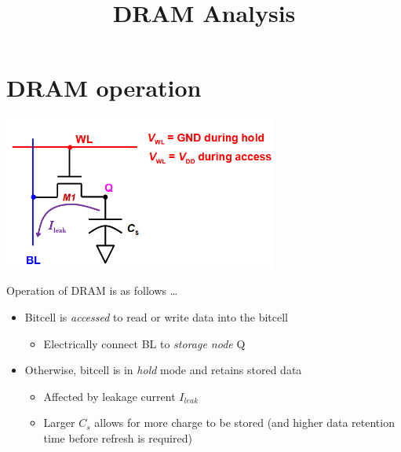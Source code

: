 \documentclass{article}
\title{\vspace{-2cm} DRAM Analysis}
\date{\vspace{-5ex}}
\begin{document}
\maketitle

\section{DRAM operation}
\begin{minipage}[c]{0.5\textwidth}
    \vspace{0pt}
    \includegraphics[width=9cm, scale=1]{dramOverview.PNG}
\end{minipage}%
\begin{minipage}[c]{0.5\textwidth}
    Operation of DRAM is as follows \dots \newline

    \begin{itemize}
        \item Bitcell is \textit{accessed} to read or write data into the bitcell
            \begin{itemize}
                \item Electrically connect BL to \textit{storage node} Q
            \end{itemize}
        \item Otherwise, bitcell is in \textit{hold} mode and retains stored data
            \begin{itemize}
                \item Affected by leakage current $I_{leak}$
                \item Larger $C_{s}$ allows for more charge to be stored (and higher data retention time before refresh is required)
            \end{itemize}
    \end{itemize}
\end{minipage}
\end{document}
